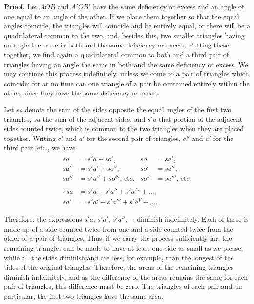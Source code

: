 \begin{description}
\textbf{Proof.} Let $AOB$ and $A'OB'$ have the same deficiency or
excess and an angle of one equal to an angle of the other. If we
place them together so that the equal angles coincide, the triangles
will coincide and be entirely equal, or there will be a
quadrilateral common to the two, and, besides this, two smaller
triangles having an angle the same in both and the same deficiency
or excess. Putting these together, we find again a quadrilateral
common to both and a third pair of triangles having an angle the
same in both and the same deficiency or excess. We may continue this
process indefinitely, unless we come to a pair of triangles which
coincide; for at no time can one triangle of a pair be contained
entirely within the other, since they have the same deficiency or
excess.

Let $so$ denote the sum of the sides opposite the equal angles of
the first two triangles, $sa$ the sum of the adjacent sides, and
$s'a$ that portion of the adjacent sides counted twice, which is
common to the two triangles when they are placed together. Writing
$o'$ and $a'$ for the second pair of triangles, $o''$ and $a'$ for
the third pair, etc., we have
\begin{gather*}
\begin{aligned}
sa   &= s'a + so',                 & so   &= sa',  \\
sa'  &= s'a' + so'',               & so'  &= sa'', \\
sa'' &= s'a'' + so'''\text{, etc.} & so'' &= sa''' \text{, etc.}
\end{aligned}\\
\begin{aligned}
\therefore sa  &= s'a  + s'a''  + s'a^{IV} + \ldots, \\
           sa' &= s'a' + s'a''' + s'a^{V}  + \ldots.
\end{aligned}
\end{gather*}

Therefore, the expressions $s'a$, $s'a'$, $s'a''$, $\cdots$ diminish
indefinitely. Each of these is made up of a side counted twice from
one and a side counted twice from the other of a pair of triangles.
Thus, if we carry the process sufficiently far, the remaining
triangles can be made to have at least one side as small as we
please, while all the sides diminish and are less, for example, than
the longest of the sides of the original triangles. Therefore, the
areas of the remaining triangles diminish indefinitely, and as the
difference of the areas remains the same for each pair of triangles,
this difference must be zero. The triangles of each pair and, in
particular, the first two triangles have the same area.


\end{description}

